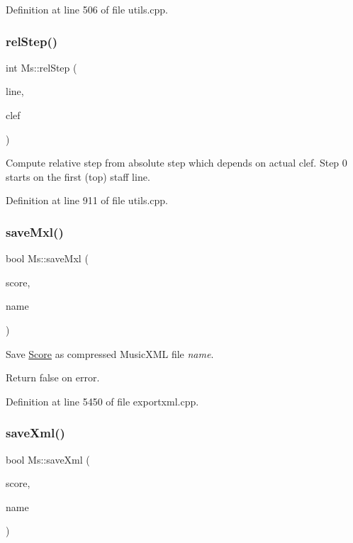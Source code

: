 Definition at line 506 of file utils.\+cpp.

\mbox{\label{namespace_ms_a08a738e4e6bfb75a294f28c9b0fb9f2a}} 
\subsubsection{\texorpdfstring{rel\+Step()}{relStep()}}
{\footnotesize\ttfamily int Ms\+::rel\+Step (\begin{DoxyParamCaption}\item[{int}]{line,  }\item[{Clef\+Type}]{clef }\end{DoxyParamCaption})}

Compute relative step from absolute step which depends on actual clef. Step 0 starts on the first (top) staff line. 

Definition at line 911 of file utils.\+cpp.

\mbox{\label{namespace_ms_a772f048bd958bf708fd495e49c49aac8}} 
\subsubsection{\texorpdfstring{save\+Mxl()}{saveMxl()}}
{\footnotesize\ttfamily bool Ms\+::save\+Mxl (\begin{DoxyParamCaption}\item[{\hyperlink{class_ms_1_1_score}{Score} $\ast$}]{score,  }\item[{const Q\+String \&}]{name }\end{DoxyParamCaption})}

Save \hyperlink{class_ms_1_1_score}{Score} as compressed Music\+X\+ML file {\itshape name}.

Return false on error. 

Definition at line 5450 of file exportxml.\+cpp.

\mbox{\label{namespace_ms_a3a19855d7730ea26f4769d635488df1d}} 
\subsubsection{\texorpdfstring{save\+Xml()}{saveXml()}}
{\footnotesize\ttfamily bool Ms\+::save\+Xml (\begin{DoxyParamCaption}\item[{\hyperlink{class_ms_1_1_score}{Score} $\ast$}]{score,  }\item[{const Q\+String \&}]{name }\end{DoxyParamCaption})}

